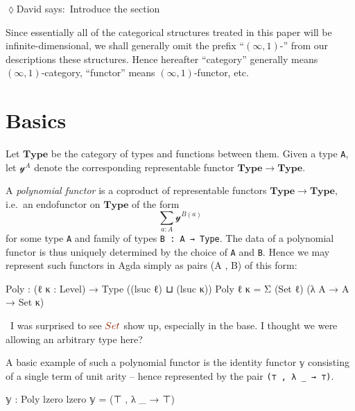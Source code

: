 \documentclass[
  11pt,
  oneside,
  article]{memoir}
\newenvironment{Shaded}{}{}
\newcommand{\DataTypeTok}[1]{\textcolor[rgb]{0.56,0.13,0.00}{#1}}
\newcommand{\NormalTok}[1]{#1}
\newcommand{\OtherTok}[1]{\textcolor[rgb]{0.00,0.44,0.13}{#1}}
\theoremstyle{definition}
\theoremstyle{plain}
\newenvironment{remark}
  {\pushQED{\qed}\renewcommand{\qedsymbol}{$\lozenge$}\remarkx}
  {\popQED\endremarkx}
\newcommand{\yon}{\mathcal{y}}
\newcommand{\0}{\textsf{0}}
\newcommand{\1}{\tn{\textsf{1}}}
\newcommand{\dnote}[1]{{\quad \color{blue}$\lozenge$\;David says:}~#1\;{\color{blue}$\lozenge$}\quad}
\begin{document}
\dnote{Introduce the section}

\begin{remark}
Since essentially all of the
categorical structures treated in this paper will be
infinite-dimensional, we shall generally omit the prefix ``\((\infty,1)\)-''
from our descriptions these structures. Hence hereafter ``category''
generally means \((\infty,1)\)-category, ``functor'' means
\((\infty,1)\)-functor, etc.
\end{remark}

\section{Basics}\label{basics}

Let \(\mathbf{Type}\) be the category of types and functions between
them. Given a type \texttt{A}, let \(\yon^A\) denote the corresponding
representable functor \(\mathbf{Type} \to \mathbf{Type}\).

A \emph{polynomial functor} is a coproduct of representable functors
\(\mathbf{Type} \to \mathbf{Type}\), i.e.~an endofunctor on
\(\mathbf{Type}\) of the form \[
\sum_{a : A} \yon^{B(a)}
\] for some type \texttt{A} and family of types
\texttt{B\ :\ A\ →\ Type}. The data of a polynomial functor is thus
uniquely determined by the choice of \texttt{A} and \texttt{B}. Hence we
may represent such functors in Agda simply as pairs (A , B) of this
form:

\begin{Shaded}
\begin{Highlighting}[]
\NormalTok{Poly }\OtherTok{:} \OtherTok{(}\NormalTok{ℓ κ }\OtherTok{:}\NormalTok{ Level}\OtherTok{)} \OtherTok{→}\NormalTok{ Type }\OtherTok{((}\NormalTok{lsuc ℓ}\OtherTok{)}\NormalTok{ ⊔ }\OtherTok{(}\NormalTok{lsuc κ}\OtherTok{))}
\NormalTok{Poly ℓ κ }\OtherTok{=}\NormalTok{ Σ }\OtherTok{(}\DataTypeTok{Set}\NormalTok{ ℓ}\OtherTok{)} \OtherTok{(λ}\NormalTok{ A }\OtherTok{→}\NormalTok{ A }\OtherTok{→} \DataTypeTok{Set}\NormalTok{ κ}\OtherTok{)}
\end{Highlighting}
\end{Shaded}\dnote{I was surprised to see $\DataTypeTok{Set}$ show up, especially in the base. I thought we were allowing an arbitrary type here?}

A basic example of such a polynomial functor is the identity functor
\texttt{𝕪} consisting of a single term of unit arity -- hence
represented by the pair \texttt{(⊤\ ,\ λ\ \_\ →\ ⊤)}.

\begin{Shaded}
\begin{Highlighting}[]
\NormalTok{𝕪 }\OtherTok{:}\NormalTok{ Poly lzero lzero}
\NormalTok{𝕪 }\OtherTok{=} \OtherTok{(}\NormalTok{⊤ , }\OtherTok{λ} \OtherTok{\_} \OtherTok{→}\NormalTok{ ⊤}\OtherTok{)}
\end{Highlighting}
\end{Shaded}
\end{document}
